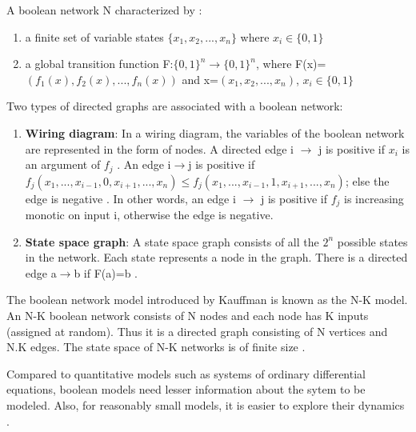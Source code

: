 \documentclass[11pt]{report}
\begin{document}
    A boolean network N characterized by \cite{Goles2010}:
    \begin{enumerate}
     \item a finite set of variable states $\{x_{1},x_{2},...,x_{n}\}$ where $x_{i} \in \{0,1\}$
     \item a global transition function F:$\{0,1\}^{n} \to \{0,1\}^{n}$, where F(x)=$(f_{1}(x),f_{2}(x),...,f_{n}(x))$ and
     x=$(x_{1},x_{2},...,x_{n})$, $x_{i} \in \{0,1\}$
    \end{enumerate}
    
    Two types of directed graphs are associated with a boolean network:
    \begin {enumerate}
     \item \textbf{Wiring diagram}: In a wiring diagram, the variables of the boolean network are represented in the form of nodes.
     A directed edge i $\to$ j is positive if $x_{i}$ is an argument of $f_{j}$ \cite{Dimitrova2011}. An edge i$\to$j is positive if 
     $f_{j}(x_{1},...,x_{i-1},0,x_{i+1},...,x_{n}) \leq f_{j}(x_{1},...,x_{i-1},1,x_{i+1},...,x_{n})$; else the edge is negative \cite{Veliz-Cuba2011}.
     In other words, an edge i $\to$ j is positive if $f_{j}$ is increasing monotic \cite{Goles2010} on input i, otherwise the edge is negative.
     \item \textbf{State space graph}: A state space graph consists of all the $2^{n}$ possible states in the network. Each state 
     represents a node in the graph. There is a directed edge a$\to$b if F(a)=b \cite{Dimitrova2011}.
    \end {enumerate}
    
    The boolean network model introduced by Kauffman is known as the N-K model. An N-K boolean network consists of N nodes and each node has K inputs (assigned at random). Thus it is a directed
    graph consisting of N vertices and N.K edges. The state space of N-K networks is of finite size \cite{Greil2012}.
    
    Compared to quantitative models such as systems of ordinary differential equations, boolean models need lesser information about the sytem to be modeled. Also, for reasonably
    small models, it is easier to explore their dynamics \cite{Dimitrova2011}.
\end{document}
